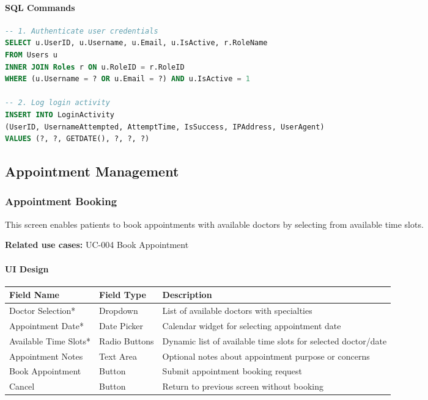 \documentclass[12pt,a4paper]{article}
\begin{document}
\paragraph{SQL Commands}

\begin{lstlisting}[language=SQL]
-- 1. Authenticate user credentials
SELECT u.UserID, u.Username, u.Email, u.IsActive, r.RoleName
FROM Users u 
INNER JOIN Roles r ON u.RoleID = r.RoleID
WHERE (u.Username = ? OR u.Email = ?) AND u.IsActive = 1

-- 2. Log login activity
INSERT INTO LoginActivity 
(UserID, UsernameAttempted, AttemptTime, IsSuccess, IPAddress, UserAgent)
VALUES (?, ?, GETDATE(), ?, ?, ?)
\end{lstlisting}

\subsection{Appointment Management}

\subsubsection{Appointment Booking}

This screen enables patients to book appointments with available doctors by selecting from available time slots.

\textbf{Related use cases:} UC-004 Book Appointment

\paragraph{UI Design}

\begin{longtable}{|p{3cm}|p{3cm}|p{8cm}|}
\hline
\textbf{Field Name} & \textbf{Field Type} & \textbf{Description} \\
\hline
Doctor Selection* & Dropdown & List of available doctors with specialties \\
\hline
Appointment Date* & Date Picker & Calendar widget for selecting appointment date \\
\hline
Available Time Slots* & Radio Buttons & Dynamic list of available time slots for selected doctor/date \\
\hline
Appointment Notes & Text Area & Optional notes about appointment purpose or concerns \\
\hline
Book Appointment & Button & Submit appointment booking request \\
\hline
Cancel & Button & Return to previous screen without booking \\
\hline
\end{longtable}
\end{document}

